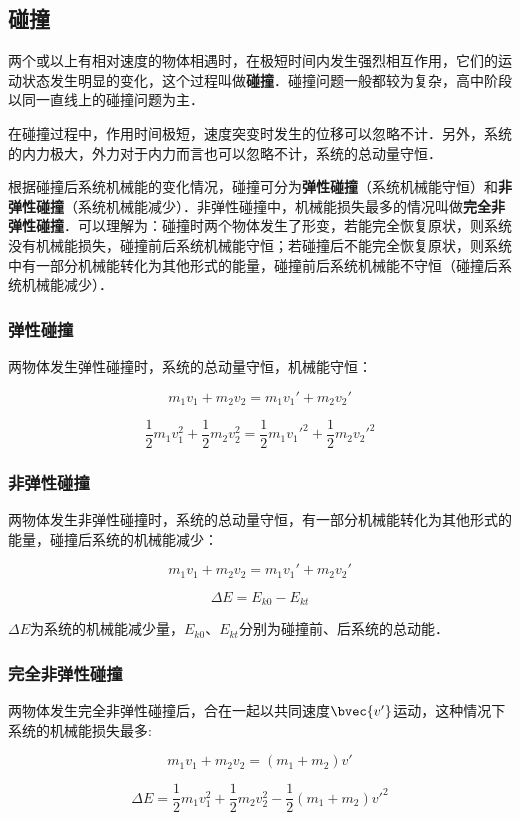 \subsection{碰撞}

两个或以上有相对速度的物体相遇时，在极短时间内发生强烈相互作用，它们的运动状态发生明显的变化，这个过程叫做\textbf{碰撞}．碰撞问题一般都较为复杂，高中阶段以同一直线上的碰撞问题为主．

在碰撞过程中，作用时间极短，速度突变时发生的位移可以忽略不计．另外，系统的内力极大，外力对于内力而言也可以忽略不计，系统的总动量守恒．

根据碰撞后系统机械能的变化情况，碰撞可分为\textbf{弹性碰撞}（系统机械能守恒）和\textbf{非弹性碰撞}（系统机械能减少）．非弹性碰撞中，机械能损失最多的情况叫做\textbf{完全非弹性碰撞}．可以理解为：碰撞时两个物体发生了形变，若能完全恢复原状，则系统没有机械能损失，碰撞前后系统机械能守恒；若碰撞后不能完全恢复原状，则系统中有一部分机械能转化为其他形式的能量，碰撞前后系统机械能不守恒（碰撞后系统机械能减少）．

\subsubsection{弹性碰撞}

两物体发生弹性碰撞时，系统的总动量守恒，机械能守恒：

\begin{equation}
m_1v_1+m_2v_2=m_1v_1'+m_2v_2'
\end{equation}

\begin{equation}
\frac12m_1v_1^2+\frac12m_2v_2^2=\frac12m_1v_1'^2+\frac12m_2v_2'^2
\end{equation}

\subsubsection{非弹性碰撞}

两物体发生非弹性碰撞时，系统的总动量守恒，有一部分机械能转化为其他形式的能量，碰撞后系统的机械能减少：

\begin{equation}
m_1v_1+m_2v_2=m_1v_1'+m_2v_2'
\end{equation}

\begin{equation}
\Delta E = E_{k0}-E_{kt}
\end{equation}

$\Delta E$为系统的机械能减少量，$E_{k0}$、$ E_{kt}$分别为碰撞前、后系统的总动能．

\subsubsection{完全非弹性碰撞}

两物体发生完全非弹性碰撞后，合在一起以共同速度$\bvec {v'}$运动，这种情况下系统的机械能损失最多:

\begin{equation}
m_1v_1+m_2v_2=(m_1+m_2)v'
\end{equation}

\begin{equation}
\Delta E=\frac12m_1v_1^2+\frac12m_2v_2^2-\frac12(m_1+m_2)v'^2
\end{equation}

